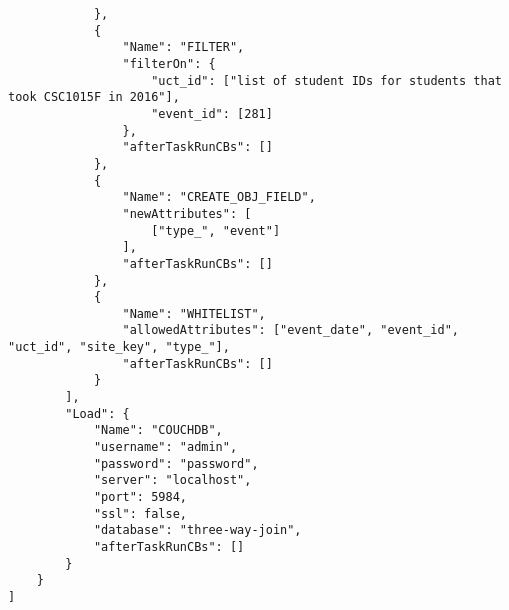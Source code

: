 \begin{verbatim}
            },
            {
                "Name": "FILTER",
                "filterOn": {
                    "uct_id": ["list of student IDs for students that took CSC1015F in 2016"],
                    "event_id": [281]
                },
                "afterTaskRunCBs": []
            },
            {
                "Name": "CREATE_OBJ_FIELD",
                "newAttributes": [
                    ["type_", "event"]
                ],
                "afterTaskRunCBs": []
            },
            {
                "Name": "WHITELIST",
                "allowedAttributes": ["event_date", "event_id", "uct_id", "site_key", "type_"],
                "afterTaskRunCBs": []
            }
        ],
        "Load": {
            "Name": "COUCHDB",
            "username": "admin",
            "password": "password",
            "server": "localhost",
            "port": 5984,
            "ssl": false,
            "database": "three-way-join",
            "afterTaskRunCBs": []
        }
    }
]
\end{verbatim}